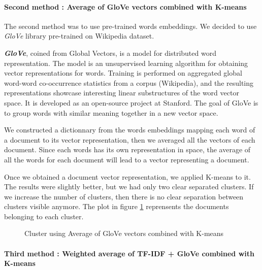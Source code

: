 \documentclass[article,twocolumn]{IEEEtran}
\begin{document}
    \hypertarget{second-method-average-of-glove-vectors-combined-with-k-means}{%
\paragraph{Second method : Average of GloVe vectors combined with
K-means}\label{second-method-average-of-glove-vectors-combined-with-k-means}}

The second method was to use pre-trained words embeddings. We decided to
use \emph{GloVe} library pre-trained on Wikipedia dataset.

\textbf{\emph{GloVe}}, coined from Global Vectors, is a model for
distributed word representation. The model is an unsupervised learning
algorithm for obtaining vector representations for words. Training is
performed on aggregated global word-word co-occurrence statistics from a
corpus (Wikipedia), and the resulting representations showcase
interesting linear substructures of the word vector space. It is
developed as an open-source project at Stanford.\cite{GloVe} The goal of
GloVe is to group words with similar meaning together in a new vector
space.

We constructed a dictionnary from the words embeddings mapping each word
of a document to its vector representation, then we averaged all the
vectors of each document. Since each words has its own representation in
space, the average of all the words for each document will lead to a
vector representing a document.

Once we obtained a document vector representation, we applied K-means to
it. The results were slightly better, but we had only two clear
separated clusters. If we increase the number of clusters, then there is
no clear separation between clusters visible anymore. The plot in figure
\ref{fig4} reprensents the documents belonging to each cluster.


    \begin{figure}
        \begin{center}\end{center}
        \caption{Cluster using Average of GloVe vectors combined with K-means }
        \label{fig4}
    \end{figure}
    
    \hypertarget{third-method-weighted-average-of-tf-idf-glove-combined-with-k-means}{%
\paragraph{Third method : Weighted average of TF-IDF + GloVe combined
with
K-means}\label{third-method-weighted-average-of-tf-idf-glove-combined-with-k-means}}
\end{document}
